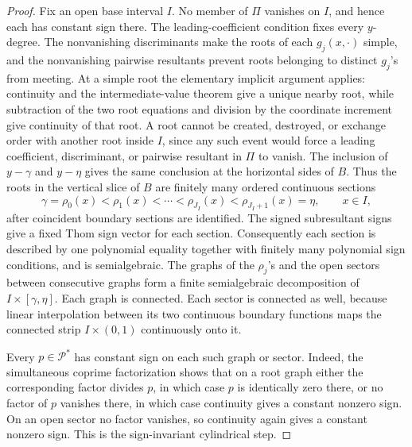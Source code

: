 \documentclass{article}
\begin{document}
\begin{proof}
Fix an open base interval \(I\).  No member of \(\Pi\) vanishes on \(I\), and hence each has constant sign there.  The leading-coefficient condition fixes every \(y\)-degree.  The nonvanishing discriminants make the roots of each \(g_j(x,\cdot)\) simple, and the nonvanishing pairwise resultants prevent roots belonging to distinct \(g_j\)'s from meeting.  At a simple root the elementary implicit argument applies: continuity and the intermediate-value theorem give a unique nearby root, while subtraction of the two root equations and division by the coordinate increment give continuity of that root.  A root cannot be created, destroyed, or exchange order with another root inside \(I\), since any such event would force a leading coefficient, discriminant, or pairwise resultant in \(\Pi\) to vanish.  The inclusion of \(y-\gamma\) and \(y-\eta\) gives the same conclusion at the horizontal sides of \(B\).  Thus the roots in the vertical slice of \(B\) are finitely many ordered continuous sections
\[
\gamma=\rho_0(x)<\rho_1(x)<\cdots<\rho_{J_I}(x)<\rho_{J_I+1}(x)=\eta,
\qquad x\in I,
\]
after coincident boundary sections are identified.  The signed subresultant signs give a fixed Thom sign vector for each section.  Consequently each section is described by one polynomial equality together with finitely many polynomial sign conditions, and is semialgebraic.  The graphs of the \(\rho_j\)'s and the open sectors between consecutive graphs form a finite semialgebraic decomposition of \(I\times[\gamma,\eta]\).  Each graph is connected.  Each sector is connected as well, because linear interpolation between its two continuous boundary functions maps the connected strip \(I\times(0,1)\) continuously onto it.

Every \(p\in\mathscr P^{*}\) has constant sign on each such graph or sector.  Indeed, the simultaneous coprime factorization shows that on a root graph either the corresponding factor divides \(p\), in which case \(p\) is identically zero there, or no factor of \(p\) vanishes there, in which case continuity gives a constant nonzero sign.  On an open sector no factor vanishes, so continuity again gives a constant nonzero sign.  This is the sign-invariant cylindrical step.


\end{proof}
\end{document}
